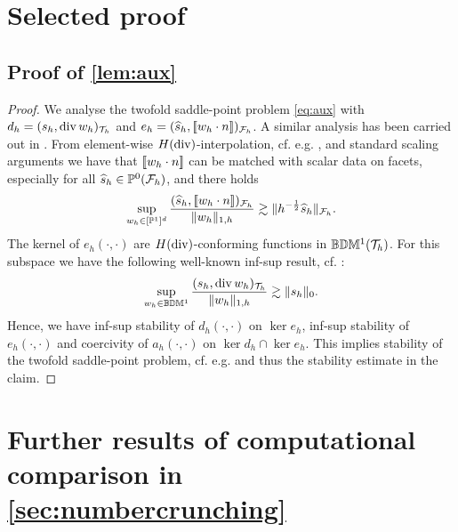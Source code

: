 \documentclass[pdflatex,sn-mathphys,Numbered]{sn-jnl}%
\renewcommand{\hat}[1]{\widehat{#1}}
\theoremstyle{remark}%
\theoremstyle{definition}%
\begin{document}
\begin{appendices}

\section{Selected proof}
\subsection{Proof of \texorpdfstring{\cref{lem:aux}}{Lemma 4}} \label{sec:proof:aux}
\begin{proof}
We analyse the twofold saddle-point problem \eqref{eq:aux} with $d_h = (s_h,\operatorname{\mathrm{div}} w_h)_{\mathcal{T}_h}$ and $e_h = (\hat{s}_h, \jmp{w_h \cdot n})_\Fh$. A similar analysis has been carried out in \cite[Lemma 4.3.6]{alemanmaster}. From element-wise $H(\operatorname{\mathrm{div}})$-interpolation, cf. e.g. \cite{brezzi}, and standard scaling arguments we have that $[\![w_h\cdot n]\!]$ can be matched with scalar data on facets, especially for all $\hat{s}_h \in \PP^0(\Fh)$, and there holds
\begin{equation}
  \sup_{w_h \in [\PP^1]^d} \frac{(\hat{s}_h, \jmp{w_h \cdot n})_\Fh}{\nrm{w_h}_{1,h}} \gtrsim \nrm{h^{-\frac12}\hat{s}_h}_{\Fh}.
\end{equation}
The kernel of $e_h(\cdot,\cdot)$ are $H(\operatorname{\mathrm{div}})$-conforming functions in $\mathbb{B}\mathbb{D}\mathbb{M}^1({\mathcal{T}_h})$. For this subspace we have the following well-known inf-sup result, cf. \cite{hansbolarson02,cockburn2007note}:
\begin{equation}
  \sup_{w_h \in \mathbb{B}\mathbb{D}\mathbb{M}^1} \frac{(s_h, \operatorname{\mathrm{div}} w_h)_{\mathcal{T}_h}}{\Vert w_h \Vert_{1,h}} \gtrsim \Vert s_h \Vert_{0}.
\end{equation}
Hence, we have inf-sup stability of $d_h(\cdot,\cdot)$ on $\ker e_h$, inf-sup stability of $e_h(\cdot,\cdot)$ and coercivity of $a_h(\cdot,\cdot)$ on $\ker d_h \cap \ker e_h$. This implies stability of the twofold saddle-point problem, cf. e.g. \cite{saddle} and thus the stability estimate in the claim.
\end{proof}

\section{Further results of computational comparison in \cref{sec:numbercrunching}} \label{app:moretables}


\end{appendices}
\end{document}
